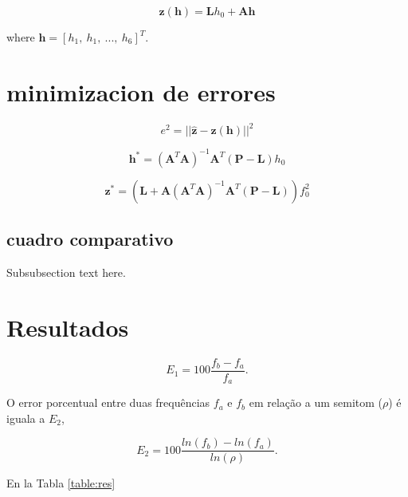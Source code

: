 \documentclass[journal]{IEEEtran}
\begin{document}
\begin{equation}
\mathbf{z}(\mathbf{h}) =  \mathbf{L}h_0 +  \mathbf{A} \mathbf{h}
\end{equation}

where $\mathbf{h}=[h_{1},~h_{1},~...,~h_{6}]^T$.
\section{minimizacion de errores}

\begin{equation}
e^2= || \mathbf{\hat{z}} - \mathbf{z}(\mathbf{h}) ||^2
\end{equation}

\begin{equation}
\mathbf{h}^{*}=
 \left(\mathbf{A}^T\mathbf{A}\right)^{-1}\mathbf{A}^T
 \left(\mathbf{P}-\mathbf{L}\right)
h_0
\end{equation}


\begin{equation}
\mathbf{z}^{*}=
\left(\mathbf{L}
+\mathbf{A}\left(\mathbf{A}^T\mathbf{A}\right)^{-1}\mathbf{A}^T
 \left(\mathbf{P}-\mathbf{L}\right) \right)
f_0^2
\end{equation}

\subsection{cuadro comparativo}
Subsubsection text here.





\section{Resultados}


\begin{equation}
E_1=100 \frac{f_b-f_a}{f_a}.
\end{equation}

O error porcentual entre duas frequências $f_a$ e $f_b$ em relação a um semitom ($\rho$) é
iguala a $E_2$,

\begin{equation}
E_2=100 \frac{ln(f_b)-ln(f_a)}{ln(\rho)}.
\end{equation}

En la Tabla \ref{table:res}
\end{document}
